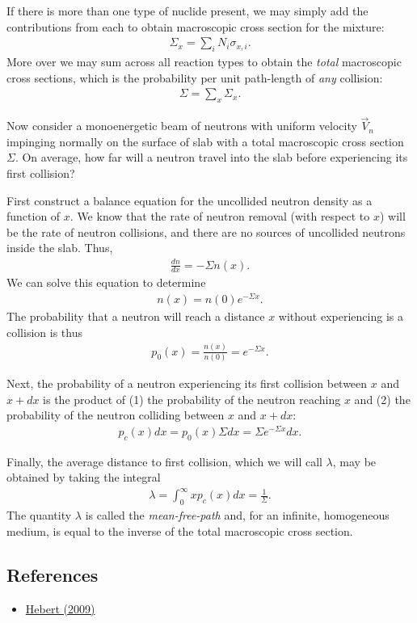 \documentclass[11pt]{article}
\begin{document}
If there is more than one type of nuclide present, we may simply add the contributions from each to obtain macroscopic cross section for the mixture:
\begin{align*}
  \Sigma_x = \sum_i N_i \sigma_{x,i}.
\end{align*}
More over we may sum across all reaction types to obtain the \emph{total} macroscopic cross sections, which is the probability per unit path-length of \emph{any} collision:
\begin{align*}
  \Sigma = \sum_x \Sigma_x.
\end{align*}

Now consider a monoenergetic beam of neutrons with uniform velocity \(\vec{V}_n\) impinging normally on the surface of slab with a total macroscopic cross section \(\Sigma\).  On average, how far will a neutron travel into the slab before experiencing its first collision?

First construct a balance equation for the uncollided neutron density as a function of \(x\).  We know that the rate of neutron removal (with respect to \(x\)) will be the rate of neutron collisions, and there are no sources of uncollided neutrons inside the slab.  Thus,
\begin{align*}
  \frac{dn}{dx} = -\Sigma n(x).
\end{align*}
We can solve this equation to determine
\begin{align*}
  n(x) = n(0) e^{-\Sigma x}.
\end{align*}
The probability that a neutron will reach a distance \(x\) without experiencing is a collision is thus
\begin{align*}
  p_0(x) = \frac{n(x)}{n(0)} = e^{-\Sigma x}.
\end{align*}

Next, the probability of a neutron experiencing its first collision between \(x\) and \(x+dx\) is the product of (1) the probability of the neutron reaching \(x\) and (2) the probability of the neutron colliding between \(x\) and \(x+dx\):
\begin{align*}
  p_c(x)dx = p_0(x) \Sigma dx = \Sigma e^{-\Sigma x} dx.
\end{align*}

Finally, the average distance to first collision, which we will call \(\lambda\), may be obtained by taking the integral
\begin{align*}
  \lambda = \int_0^\infty x p_c(x) dx = \frac{1}{\Sigma}.
\end{align*}
The quantity \(\lambda\) is called the \emph{mean-free-path} and, for an infinite, homogeneous medium, is equal to the inverse of the total macroscopic cross section.


\subsection{References}
\label{sec:orgheadline12}
\begin{itemize}
\item \href{Hebert2009}{Hebert (2009)}
\end{itemize}
\end{document}
